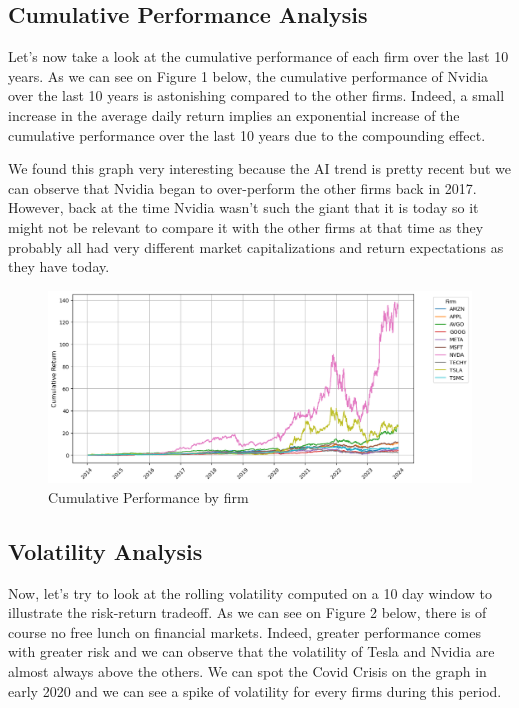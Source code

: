 \documentclass[12pt, oneside]{article}
\begin{document}
\subsection{Cumulative Performance Analysis}
Let's now take a look at the cumulative performance of each firm over the last 10 years. As we can see on Figure 1 below, the cumulative performance of Nvidia over the last 10 years is astonishing compared to the other firms. Indeed, a small increase in the average daily return implies an exponential increase of the cumulative performance over the last 10 years due to the compounding effect. 

We found this graph very interesting because the AI trend is pretty recent but we can observe that Nvidia began to over-perform the other firms back in 2017. However, back at the time Nvidia wasn't such the giant that it is today so it might not be relevant to compare it with the other firms at that time as they probably all had very different market capitalizations and return expectations as they have today.

\begin{figure}[H]
    \centering
    \includegraphics[width=0.8\linewidth]{cum_perf_analysis.png}
    \caption{Cumulative Performance by firm}
    \label{fig:cum_perf}
\end{figure}


\subsection{Volatility Analysis}
Now, let's try to look at the rolling volatility computed on a 10 day window to illustrate the risk-return tradeoff. As we can see on Figure 2 below, there is of course no free lunch on financial markets. Indeed, greater performance comes with greater risk and we can observe that the volatility of Tesla and Nvidia are almost always above the others. We can spot the Covid Crisis on the graph in early 2020 and we can see a spike of volatility for every firms during this period.
\end{document}
